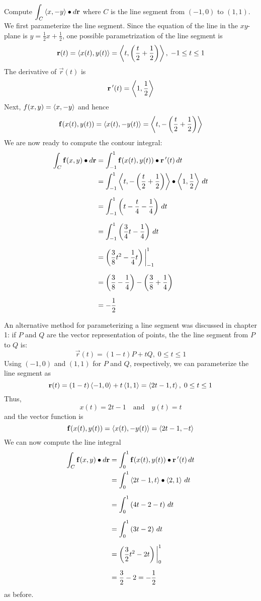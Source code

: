 \documentclass[handout]{ximera}
\begin{document}
 
\begin{example}[example 1]
Compute $\displaystyle \int_C \left\langle x, -y\right\rangle \bullet d\mathbf r$ where $C$ is the line segment from $(-1, 0)$ to $(1,1)$.\\
We first parameterize the line segment. Since the equation of the line in the $xy$-plane is $y = \frac12x + \frac12$,
one possible parametrization of the line segment is
\[
\mathbf r(t) = \left\langle x(t), y(t)\right\rangle = \left\langle t , \left(\frac{t}{2} + \frac12\right)\right\rangle, \; -1 \leq t \leq 1
\]
The derivative of $\vec r(t)$ is 
\[
\mathbf r\,'(t) = \left\langle 1, \frac{1}{2}\right\rangle
\]
Next, $f(x, y) = \left\langle x, -y\right\rangle$ and hence
\[
\mathbf f(x(t), y(t)) = \left\langle x(t), -y(t)\right\rangle = \left\langle t , -\left(\frac{t}{2} + \frac12\right)\right\rangle
\]
We are now ready to compute the contour integral:
\begin{align*}
\int_C \mathbf f(x, y) \bullet d\mathbf r &= \int_{-1}^1 \mathbf f(x(t), y(t)) \bullet \mathbf r\,'(t) \, dt\\
                             &= \int_{-1}^1 \left\langle t , -\left(\frac{t}{2} + \frac12\right)\right\rangle \bullet  \left\langle 1, \frac{1}{2}\right\rangle \, dt\\[6pt]
                             &= \int_{-1}^1 \left(t -\frac{t}{4} - \frac14\right) \, dt\\[6pt]
                             &= \int_{-1}^1 \left(\frac34 t - \frac14\right) \, dt\\[6pt]
                             &= \left(\frac38 t^2 - \frac14 t\right)\bigg|_{-1}^1\\[6pt]
                         &= \left(\frac38 - \frac14\right) - \left(\frac38 + \frac14\right)\\[6 pt]
                        &= -\frac12
\end{align*}

An alternative method for parameterizing a line segment was discussed in chapter 1: if $P$ and $Q$ are the vector representation of points, the the line segment from 
$P$ to $Q$ is:
\[
\vec r(t) = (1-t)P + tQ, \; 0 \leq t \leq 1
\]
Using $(-1, 0)$ and $(1,1)$ for $P$ and $Q$, respectively, we can parameterize the line segment as
\[
\mathbf r(t) = (1-t) \left\langle -1, 0\right\rangle + t\left\langle 1,1\right\rangle = \left\langle 2t-1, t\right\rangle, \; 0\leq t \leq 1
\]
Thus,
\[
x(t) = 2t-1 \quad \text{and} \quad y(t) = t
\]
and the vector function is
\[
\mathbf f(x(t), y(t)) = \left\langle x(t), -y(t)\right\rangle = \left\langle 2t-1, -t\right\rangle
\]
We can now compute the line integral
\begin{align*}
\int_C \mathbf f(x, y) \bullet d\mathbf r &= \int_0^1 \mathbf f(x(t), y(t)) \bullet \mathbf r\,'(t) \, dt\\
                             &= \int_0^1 \left\langle 2t-1, t\right\rangle \bullet  \left\langle 2, 1\right\rangle \, dt\\[6pt]
                             &= \int_0^1 \left(4t-2 -t\right) \, dt\\[6pt]
                             &= \int_0^1 \left(3t-2\right) \, dt\\[6pt]
                             &= \left(\frac32 t^2 - 2 t\right)\bigg|_0^1\\[6pt]
                        &= \frac32 - 2 = -\frac12
\end{align*}
as before.
\end{example}
\end{document}
